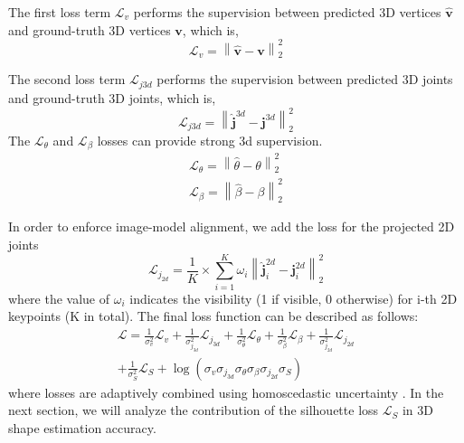 \documentclass[journal]{IEEEtran}
\begin{document}
The first loss term $\mathcal{L}_v$ performs the supervision between predicted 3D vertices $\hat{\bm{v}}$ and ground-truth 3D vertices $\bm{v}$, which is,
\begin{equation}
    \mathcal{L}_v = \left \| \hat{\bm{v}} -\bm{v}   \right \| _{2}^{2}
\end{equation}

The second loss term $\mathcal{L}_{j3d}$ performs the supervision between predicted 3D joints and ground-truth 3D joints, which is,
\begin{equation}
    \mathcal{L}_{j3d} = \left \| \hat{\bm{j}}^{3d} - \bm{j}^{3d}  \right \|  _{2}^{2}
\end{equation}
The $\mathcal{L}_{\theta}$ and $\mathcal{L}_{\beta}$ losses can provide strong 3d supervision.
\begin{gather}
    \mathcal{L}_{\theta} = \left \| \hat{\theta} - \theta  \right \|  _{2}^{2} \\
    \mathcal{L}_{\beta} = \left \| \hat{\beta} - \beta  \right \|  _{2}^{2}
\end{gather}

In order to enforce image-model alignment, we add the loss for the projected 2D joints
\begin{equation}
    \mathcal{L}_{j_{2d}}=\frac{1}{K} \times {\textstyle \sum_{i=1}^{K}} \omega _{i}\left \| \hat{\bm{j}}^{2d}_{i}-\bm{j}^{2d}_{i}  \right \| _{2}^{2}
\end{equation}
where the value of $\omega_{i}$ indicates the visibility (1 if visible, 0 otherwise) for i-th 2D keypoints (K in total).
The final loss function can be described as follows:
\begin{equation}
\begin{split}
    \mathcal{L}=\frac{1}{\sigma_{v}^{2}} \mathcal{L}_{v}+\frac{1}{\sigma_{j_{3d}}^{2}} \mathcal{L}_{j_{3d}}+\frac{1}{\sigma_{\theta}^{2}} \mathcal{L}_{\theta}+\frac{1}{\sigma_{\beta}^{2}} \mathcal{L}_{\beta}+\frac{1}{\sigma_{j_{2d}}^{2}} \mathcal{L}_{j_{2d}} \\
    +\frac{1}{\sigma_{S}^{2}} \mathcal{L}_{S}
    +\log \left(\sigma_{v} \sigma_{j_{3d}} \sigma_{\theta} \sigma_{\beta} \sigma_{j_{2d}} \sigma_{S}\right)
\end{split}
\end{equation}
where losses are adaptively combined using homoscedastic uncertainty \cite{kendall2018multi}.
In the next section, we will analyze the contribution of the silhouette loss $\mathcal{L}_{S}$ in 3D shape estimation accuracy.
\end{document}
